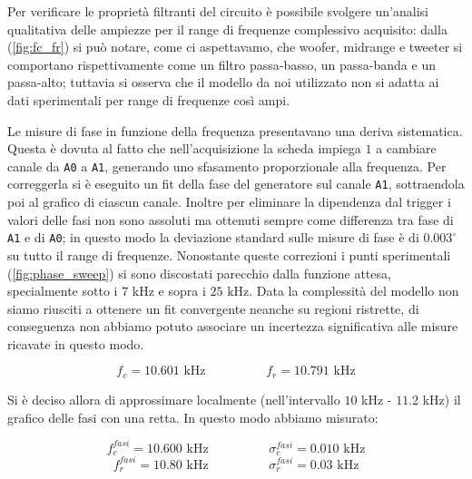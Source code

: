 \documentclass[12pt,italian]{article}
\begin{document}
Per verificare le proprietà filtranti del circuito è possibile svolgere
un'analisi qualitativa delle ampiezze per il range di frequenze complessivo
acquisito: dalla (\cref{fig:fc_fr}) si può notare, come ci aspettavamo, che
woofer, midrange e tweeter si comportano rispettivamente come un filtro
passa-basso, un passa-banda e un passa-alto; tuttavia si osserva che il modello
da noi utilizzato non si adatta ai dati sperimentali per range di frequenze
così ampi.

Le misure di fase in funzione della frequenza presentavano una deriva
sistematica. Questa è dovuta al fatto che nell'acquisizione la scheda impiega
$1$  a cambiare canale da \texttt{A0} a \texttt{A1}, generando uno
sfasamento proporzionale alla frequenza. Per correggerla si è eseguito un fit
della fase del generatore sul canale \texttt{A1}, sottraendola poi al grafico
di ciascun canale. Inoltre per eliminare la dipendenza dal trigger i valori
delle fasi non sono assoluti ma ottenuti sempre come differenza tra fase di
\texttt{A1} e di \texttt{A0}; in questo modo la deviazione standard sulle
misure di fase è di $0.003^\circ$ su tutto il range di frequenze. Nonostante
queste correzioni i punti sperimentali (\cref{fig:phase_sweep}) si sono
discostati parecchio dalla funzione attesa, specialmente sotto i $7$ kHz e
sopra i $25$ kHz. Data la complessità del modello non siamo riusciti a ottenere
un fit convergente neanche su regioni ristrette, di conseguenza non abbiamo
potuto associare un incertezza significativa alle misure ricavate in questo
modo.

\begin{equation*}
	f_{c} = 10.601 \text{ kHz} \hspace{2cm} f_{r} = 10.791 \text{ kHz}
\end{equation*}

\noindent
Si è deciso allora di approssimare localmente (nell'intervallo $10$ kHz -
$11.2$ kHz) il grafico delle fasi con una retta. In questo modo abbiamo
misurato:

\begin{equation*}
	f_{c}^{fasi} = 10.600 \text{ kHz}  \hspace{2cm}  \sigma_c^{fasi} = 0.010 \text{ kHz}
\end{equation*}
\begin{equation*}
	f_{r}^{fasi} = 10.80 \text{ kHz}  \hspace{2cm}  \sigma_r^{fasi} = 0.03 \text{ kHz}
\end{equation*}
\end{document}
